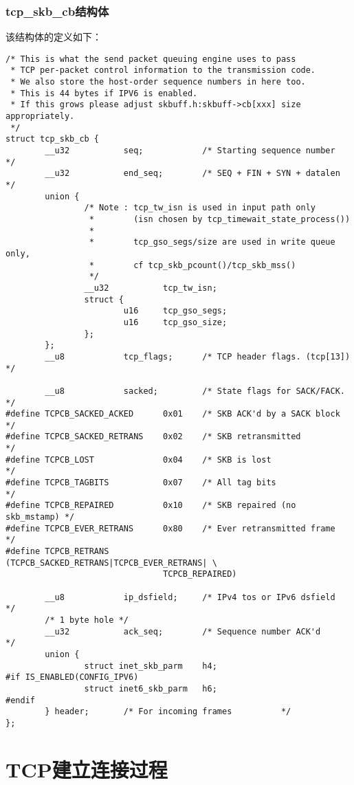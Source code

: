 \documentclass[11pt, a4paper,oneside]{book}
\theoremstyle{ocrenumbox}
\theoremstyle{purplenumbox}
\theoremstyle{blackbox}
\begin{document}
\subsection{tcp\_skb\_cb结构体}
\label{subsec:tcp_skb_sb_structure}
该结构体的定义如下：
\begin{verbatim}
/* This is what the send packet queuing engine uses to pass
 * TCP per-packet control information to the transmission code.
 * We also store the host-order sequence numbers in here too.
 * This is 44 bytes if IPV6 is enabled.
 * If this grows please adjust skbuff.h:skbuff->cb[xxx] size appropriately.
 */
struct tcp_skb_cb {
        __u32           seq;            /* Starting sequence number     */
        __u32           end_seq;        /* SEQ + FIN + SYN + datalen    */
        union {
                /* Note : tcp_tw_isn is used in input path only
                 *        (isn chosen by tcp_timewait_state_process())
                 *
                 *        tcp_gso_segs/size are used in write queue only,
                 *        cf tcp_skb_pcount()/tcp_skb_mss()
                 */
                __u32           tcp_tw_isn;
                struct {
                        u16     tcp_gso_segs;
                        u16     tcp_gso_size;
                };
        };
        __u8            tcp_flags;      /* TCP header flags. (tcp[13])  */

        __u8            sacked;         /* State flags for SACK/FACK.   */
#define TCPCB_SACKED_ACKED      0x01    /* SKB ACK'd by a SACK block    */
#define TCPCB_SACKED_RETRANS    0x02    /* SKB retransmitted            */
#define TCPCB_LOST              0x04    /* SKB is lost                  */
#define TCPCB_TAGBITS           0x07    /* All tag bits                 */
#define TCPCB_REPAIRED          0x10    /* SKB repaired (no skb_mstamp) */
#define TCPCB_EVER_RETRANS      0x80    /* Ever retransmitted frame     */
#define TCPCB_RETRANS           (TCPCB_SACKED_RETRANS|TCPCB_EVER_RETRANS| \
                                TCPCB_REPAIRED)

        __u8            ip_dsfield;     /* IPv4 tos or IPv6 dsfield     */
        /* 1 byte hole */
        __u32           ack_seq;        /* Sequence number ACK'd        */
        union {
                struct inet_skb_parm    h4;
#if IS_ENABLED(CONFIG_IPV6)
                struct inet6_skb_parm   h6;
#endif
        } header;       /* For incoming frames          */
};
\end{verbatim}
        
\chapter{TCP建立连接过程}
\end{document}
